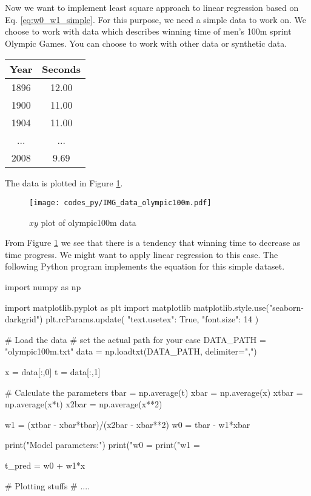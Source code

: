 Now we want to implement least square approach to linear regression based on
Eq. \ref{eq:w0_w1_simple}. For this purpose, we need a simple data to work on.
We choose to work with  data which describes 
winning time of men's 100m sprint Olympic Games. You can choose to work with other
data or synthetic data.

\begin{table}[h]
\begin{center}
\begin{tabular}{|c|c|}
\hline
Year & Seconds \\
\hline
1896 & 12.00 \\
1900 & 11.00 \\
1904 & 11.00 \\
...  & ...   \\
2008 & 9.69  \\
\hline
\end{tabular}
\end{center}
\end{table}

The data is plotted in Figure \ref{fig:olympic100m}.

\begin{figure}[h]
\begin{center}
\texttt{[image: codes\_py/IMG\_data\_olympic100m.pdf]}
\end{center}
\caption{$xy$ plot of olympic100m data}
\label{fig:olympic100m}
\end{figure}

From Figure \ref{fig:olympic100m} we see that there is a tendency that winning time
to decrease as time progress. We might want to apply linear regression to this case.
The following Python program implements the equation \label{eq:w0_w1_simple} for this
simple dataset.

\begin{pythoncode}
import numpy as np

import matplotlib.pyplot as plt
import matplotlib
matplotlib.style.use("seaborn-darkgrid")
plt.rcParams.update({
    "text.usetex": True,
    "font.size": 14}
)

# Load the data
# set the actual path for your case
DATA_PATH = "olympic100m.txt"
data = np.loadtxt(DATA_PATH, delimiter=",")

x = data[:,0]
t = data[:,1]
    
# Calculate the parameters
tbar = np.average(t)
xbar = np.average(x)
xtbar = np.average(x*t)
x2bar = np.average(x**2)
    
w1 = (xtbar - xbar*tbar)/(x2bar - xbar**2)
w0 = tbar - w1*xbar
    
print("Model parameters:")
print("w0 = %
print("w1 = %
    
t_pred = w0 + w1*x

# Plotting stuffs
# ....
\end{pythoncode}

